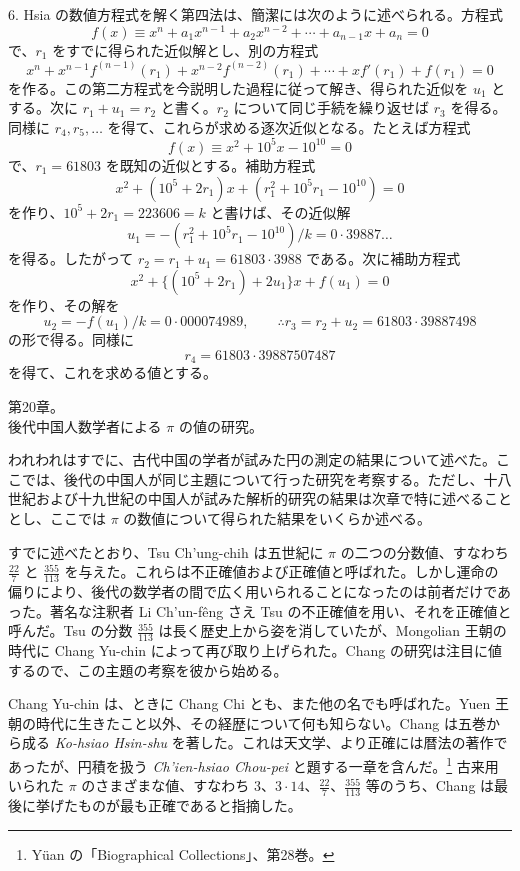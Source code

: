 \documentclass[11pt]{article}
\newcommand{\scanpage}[2]{\clearpage\setcounter{footnote}{0}\noindent{\footnotesize\color{gray}PDF #1 頁 · #2}\par\medskip}
\newcommand{\scanfooter}{}
\begin{document}
6. Hsia の数値方程式を解く第四法は、簡潔には次のように述べられる。方程式
\[
f(x)\equiv x^n+a_1x^{n-1}+a_2x^{n-2}+\cdots+a_{n-1}x+a_n=0
\]
で、$r_1$ をすでに得られた近似解とし、別の方程式
\[
x^n+x^{n-1}f^{(n-1)}(r_1)+x^{n-2}f^{(n-2)}(r_1)+\cdots+xf'(r_1)+f(r_1)=0
\]
を作る。この第二方程式を今説明した過程に従って解き、得られた近似を $u_1$ とする。次に $r_1+u_1=r_2$ と書く。$r_2$ について同じ手続を繰り返せば $r_3$ を得る。同様に $r_4,r_5,\ldots$ を得て、これらが求める逐次近似となる。たとえば方程式
\[
f(x)\equiv x^2+10^5x-10^{10}=0
\]
で、$r_1=61803$ を既知の近似とする。補助方程式
\[
x^2+(10^5+2r_1)x+(r_1^2+10^5r_1-10^{10})=0
\]
を作り、$10^5+2r_1=223606=k$ と書けば、その近似解
\[
u_1=-(r_1^2+10^5r_1-10^{10})/k=0\cdot 39887\ldots
\]
を得る。したがって $r_2=r_1+u_1=61803\cdot 3988$ である。次に補助方程式
\[
x^2+\{(10^5+2r_1)+2u_1\}x+f(u_1)=0
\]
を作り、その解を
\[
u_2=-f(u_1)/k=0\cdot 000074989,
\qquad \therefore r_3=r_2+u_2=61803\cdot 39887498
\]
の形で得る。同様に
\[
r_4=61803\cdot 39887507487
\]
を得て、これを求める値とする。
\scanfooter

\scanpage{0149}{第20章冒頭、印刷頁135}
\begin{center}
第20章。\\
後代中国人数学者による $\pi$ の値の研究。
\end{center}

われわれはすでに、古代中国の学者が試みた円の測定の結果について述べた。ここでは、後代の中国人が同じ主題について行った研究を考察する。ただし、十八世紀および十九世紀の中国人が試みた解析的研究の結果は次章で特に述べることとし、ここでは $\pi$ の数値について得られた結果をいくらか述べる。

すでに述べたとおり、Tsu Ch'ung-chih は五世紀に $\pi$ の二つの分数値、すなわち $\frac{22}{7}$ と $\frac{355}{113}$ を与えた。これらは不正確値および正確値と呼ばれた。しかし運命の偏りにより、後代の数学者の間で広く用いられることになったのは前者だけであった。著名な注釈者 Li Ch'un-fêng さえ Tsu の不正確値を用い、それを正確値と呼んだ。Tsu の分数 $\frac{355}{113}$ は長く歴史上から姿を消していたが、Mongolian 王朝の時代に Chang Yu-chin によって再び取り上げられた。Chang の研究は注目に値するので、この主題の考察を彼から始める。

Chang Yu-chin は、ときに Chang Chi とも、また他の名でも呼ばれた。Yuen 王朝の時代に生きたこと以外、その経歴について何も知らない。Chang は五巻から成る \emph{Ko-hsiao Hsin-shu} を著した。これは天文学、より正確には暦法の著作であったが、円積を扱う \emph{Ch'ien-hsiao Chou-pei} と題する一章を含んだ。\footnote{Yüan の「Biographical Collections」、第28巻。} 古来用いられた $\pi$ のさまざまな値、すなわち $3$、$3\cdot14$、$\frac{22}{7}$、$\frac{355}{113}$ 等のうち、Chang は最後に挙げたものが最も正確であると指摘した。
\end{document}
